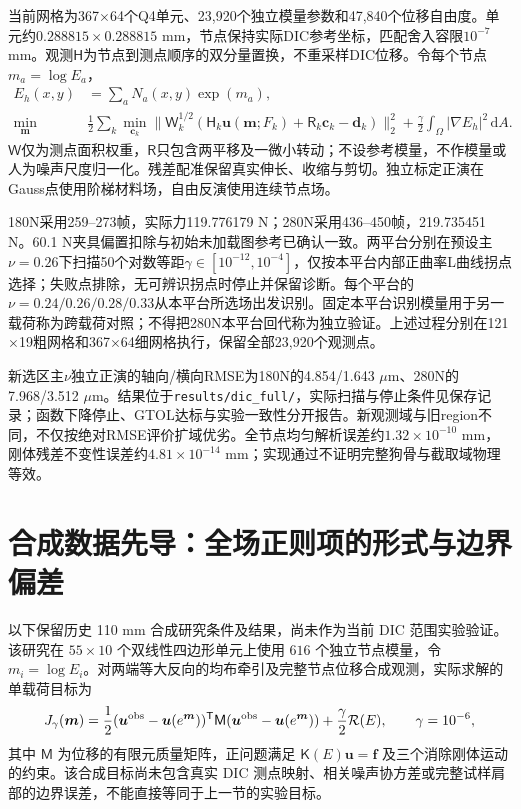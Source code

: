 \documentclass[11pt,a4paper]{ctexart}
\begin{document}
当前网格为367$\times$64个Q4单元、23,920个独立模量参数和47,840个位移自由度。单元约$0.288815\times0.288815$ mm，节点保持实际DIC参考坐标，匹配舍入容限$10^{-7}$ mm。观测$\mathsf H$为节点到测点顺序的双分量置换，不重采样DIC位移。令每个节点$m_a=\log E_a$，
\begin{align}
 E_h(x,y)&=\sum_aN_a(x,y)\exp(m_a),\\
 \min_{\boldsymbol m}\quad &\frac12\sum_k\min_{\boldsymbol c_k}
 \|\mathsf W_k^{1/2}(\mathsf H_k\boldsymbol u(\boldsymbol m;F_k)+\mathsf R_k\boldsymbol c_k-\boldsymbol d_k)\|_2^2
 +\frac\gamma2\int_\Omega|\nabla E_h|^2\,\mathrm dA.
\end{align}
$\mathsf W$仅为测点面积权重，$\mathsf R$只包含两平移及一微小转动；不设参考模量，不作模量或人为噪声尺度归一化。残差配准保留真实伸长、收缩与剪切。独立标定正演在Gauss点使用阶梯材料场，自由反演使用连续节点场。

180N采用259--273帧，实际力119.776179 N；280N采用436--450帧，219.735451 N。60.1 N夹具偏置扣除与初始未加载图参考已确认一致。两平台分别在预设主$\nu=0.26$下扫描50个对数等距$\gamma\in[10^{-12},10^{-4}]$，仅按本平台内部正曲率L曲线拐点选择；失败点排除，无可辨识拐点时停止并保留诊断。每个平台的$\nu=0.24/0.26/0.28/0.33$从本平台所选场出发识别。固定本平台识别模量用于另一载荷称为跨载荷对照；不得把280N本平台回代称为独立验证。上述过程分别在121$\times$19粗网格和367$\times$64细网格执行，保留全部23,920个观测点。

新选区主$\nu$独立正演的轴向/横向RMSE为180N的4.854/1.643 $\mu\mathrm m$、280N的7.968/3.512 $\mu\mathrm m$。结果位于\texttt{results/dic\_full/}，实际扫描与停止条件见保存记录；函数下降停止、GTOL达标与实验一致性分开报告。新观测域与旧region不同，不仅按绝对RMSE评价扩域优劣。全节点均匀解析误差约$1.32\times10^{-10}$ mm，刚体残差不变性误差约$4.81\times10^{-14}$ mm；实现通过不证明完整狗骨与截取域物理等效。

\section{合成数据先导：全场正则项的形式与边界偏差}
以下保留历史 110 mm 合成研究条件及结果，尚未作为当前 DIC 范围实验验证。该研究在 $55\times10$ 个双线性四边形单元上使用 $616$ 个独立节点模量，令 $m_i=\log E_i$。对两端等大反向的均布牵引及完整节点位移合成观测，实际求解的单载荷目标为
\begin{equation}\label{eq:synthetic_objective}
 J_\gamma(\boldsymbol m)
 =\frac12(\boldsymbol u^{\rm obs}-\boldsymbol u(e^{\boldsymbol m}))^{\mathsf T}
 \mathsf M(\boldsymbol u^{\rm obs}-\boldsymbol u(e^{\boldsymbol m}))
 +\frac{\gamma}{2}\mathcal R(E),\qquad \gamma=10^{-6},
\end{equation}
其中 $\mathsf M$ 为位移的有限元质量矩阵，正问题满足 $\mathsf K(E)\boldsymbol u=\boldsymbol f$ 及三个消除刚体运动的约束。该合成目标尚未包含真实 DIC 测点映射、相关噪声协方差或完整试样肩部的边界误差，不能直接等同于上一节的实验目标。
\end{document}
